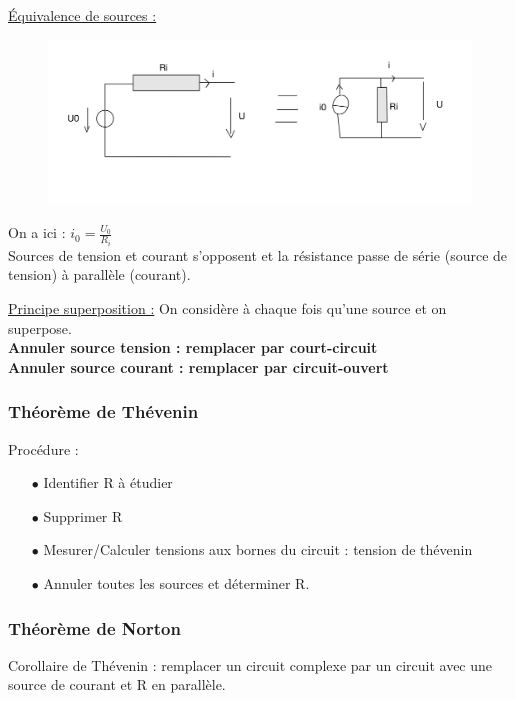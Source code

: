 \documentclass[../main.tex]{subfiles}
\begin{document}
\quad \underline{Équivalence de sources :}\\
\begin{figure}[hbt!]
    \centering
    \includegraphics[width=.6\textwidth]{IMAGES/elec/eqsource.jpeg}
    
\end{figure}    
    On a ici : $i_0 = \frac{U_0}{R_i}$\\
Sources de tension et courant s'opposent et la résistance passe de série (source de tension) à parallèle (courant).

\newpage

\quad \underline{Principe superposition :}
On considère à chaque fois qu'une source et on superpose.\\
\textbf{Annuler source tension : remplacer par court-circuit}\\
\textbf{Annuler source courant : remplacer par circuit-ouvert}\\

\subsubsection{Théorème de Thévenin}
Procédure : \begin{itemize}
    \item[$\bullet$] Identifier R à étudier\\
    \item[$\bullet$] Supprimer R\\
    \item[$\bullet$] Mesurer/Calculer tensions aux bornes du circuit : tension de thévenin\\
    \item[$\bullet$] Annuler toutes les sources et déterminer R.
\end{itemize}

\subsubsection{Théorème de Norton}
Corollaire de Thévenin : remplacer un circuit complexe par un circuit avec une source de courant et R en parallèle.
\end{document}

